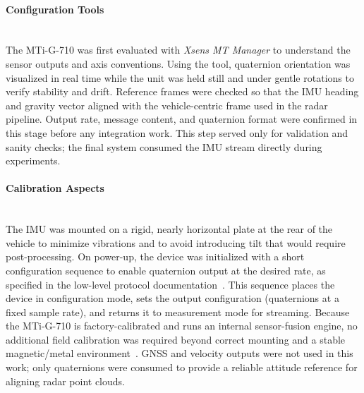 \paragraph{Configuration Tools}
\hfill
\\
The MTi-G-710 was first evaluated with \textit{Xsens MT Manager} to understand the sensor outputs and axis conventions.  
Using the tool, quaternion orientation was visualized in real time while the unit was held still and under gentle rotations to verify stability and drift.  
Reference frames were checked so that the IMU heading and gravity vector aligned with the vehicle-centric frame used in the radar pipeline.  
Output rate, message content, and quaternion format were confirmed in this stage before any integration work.  
This step served only for validation and sanity checks; the final system consumed the IMU stream directly during experiments.  
\vspace{0.5em}
\paragraph{Calibration Aspects}
\hfill
\\
The IMU was mounted on a rigid, nearly horizontal plate at the rear of the vehicle to minimize vibrations and to avoid introducing tilt that would require post-processing.  
On power-up, the device was initialized with a short configuration sequence to enable quaternion output at the desired rate, as specified in the low-level protocol documentation~\cite{mti_lowlevel_doc}.  
This sequence places the device in configuration mode, sets the output configuration (quaternions at a fixed sample rate), and returns it to measurement mode for streaming.  
Because the MTi-G-710 is factory-calibrated and runs an internal sensor-fusion engine, no additional field calibration was required beyond correct mounting and a stable magnetic/metal environment~\cite{mti710_manual}.  
GNSS and velocity outputs were not used in this work; only quaternions were consumed to provide a reliable attitude reference for aligning radar point clouds.  
